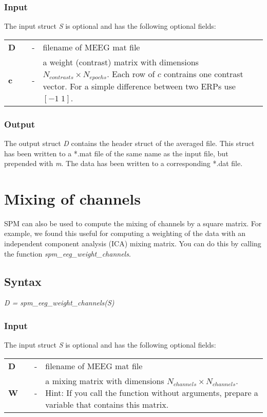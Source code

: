\subsubsection{Input}
The input struct {\it S} is optional and has the following optional fields:

\begin{tabular}{llcp{9cm}}
{\bf D} & & - & filename of MEEG mat file\\
{\bf c} & & - & a weight (contrast) matrix with dimensions
$N_{contrasts} \times N_{epochs}$. Each row of $c$ contrains one contrast
vector. For a simple difference between two ERPs use $[-1 \; 1]$.
\end{tabular}

\subsubsection{Output}
The output struct {\it D} contains the header struct of the averaged
file. This struct has been written to a *.mat file of the same name as
the input file, but prepended with {\it m}. The data has been
written to a corresponding *.dat file.

\section{Mixing of channels}
SPM can also be used to compute the mixing of channels by a square
matrix. For example, we found this useful for computing a weighting
of the data with an independent component analysis (ICA) mixing
matrix. You can do this by calling the function
\textit{spm\_eeg\_weight\_channels}.

\subsection{Syntax}
\textit{D = spm\_eeg\_weight\_channels(S)}
\\

\subsubsection{Input}
The input struct {\it S} is optional and has the following optional fields:

\begin{tabular}{llcp{9cm}}
{\bf D} & & - & filename of MEEG mat file\\
{\bf W} & & - & a mixing matrix with dimensions $N_{channels} \times
N_{channels}$. Hint: If you call the function without arguments, prepare a
variable that contains this matrix.
\end{tabular}

